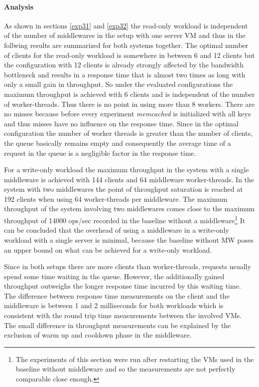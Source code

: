\documentclass[report.tex]{subfiles}
\begin{document}
\paragraph{Analysis}

As shown in sections \ref{exp31} and \ref{exp32} the read-only workload is independent of the number of middlewares in the setup with one server VM and thus in the follwing results are summarized for both systems together.
The optimal number of clients for the read-only workload is somewhere in between 6 and 12 clients but the configuration with 12 clients is already strongly affected by the bandwidth bottleneck and results in a response time that is almost two times as long with only a small gain in throughput. So under the evaluated configurations the maximum throughput is achieved with 6 clients and is independent of the number of worker-threads. Thus there is no point in using more than 8 workers. 
There are no misses because before every experiment \emph{memcached} is initialized with all keys and thus misses have no influence on the response time. Since in the optimal configuration the number of worker threads is greater than the number of clients, the queue basically remains empty and consequently the average time of a request in the queue is a negligible factor in the response time.

For a write-only workload the maximum throughput  in the system with a single middleware is achieved with 144 clients and 64 middleware worker-threads. In the system with two middlewares the point of throughput saturation is reached at 192 clients when using 64 worker-threads per middleware. The maximum throughput of the system involving two middlewares comes close to the maximum throughput of 14000 ops/sec recorded in the baseline without a middleware\footnote{The experiments of this section were run after restarting the VMs used in the baseline without middleware and so the measurements are not perfectly comparable close enough.} 
It can be concluded that the overhead of using a middleware in a write-only workload with a single server is minimal, because the baseline without MW poses an upper bound on what can be achieved for a write-only workload.

Since in both setups there are more clients than worker-threads, requests usually spend some time waiting in the queue. However, the additionally gained throughput outweighs the longer response time incurred by this waiting time.
The difference between response time measurements on the client and the middleware is between 1 and 2 milliseconds for both workloads which is consistent with the round trip time measurements between the involved VMs. The small difference in throughput measurements can be explained by the exclusion of warm up and cooldown phase in the middleware. 
\end{document}
